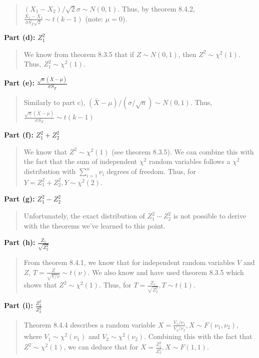 \documentclass[
]{article}
\begin{document}
\begin{quote}
\((X_1 - X_2)/\sqrt{2}\sigma \sim N(0,1)\). Thus, by theorem 8.4.2,
\(\frac{X_1 - X_2}{\sigma S_Z \sqrt{2}} \sim t(k - 1)\) (note:
\(\mu = 0\)).
\end{quote}

\textbf{Part (d):} \(Z_1^2\)

\begin{quote}
We know from theorem 8.3.5 that if \(Z\sim N(0,1)\), then
\(Z^2 \sim \chi^2(1)\). Thus, \(Z_1^2 \sim \chi^2(1)\).
\end{quote}

\textbf{Part (e):} \(\frac{\sqrt{n} (\bar{X} - \mu)}{\sigma S_Z}\)

\begin{quote}
Similarly to part c), \((\bar{X} - \mu)/(\sigma/\sqrt{n}) \sim N(0,1)\).
Thus, \(\frac{\sqrt{n} (\bar{X} - \mu)}{\sigma S_Z} \sim t(k - 1)\)
\end{quote}

\textbf{Part (f):} \(Z_1^2 + Z_2^2\)

\begin{quote}
We know that \(Z^2 \sim \chi^2(1)\) (see theorem 8.3.5). We can combine
this with the fact that the sum of independent \(\chi^2\) random
variables follows a \(\chi^2\) distribution with
\(\sum_{i = 1}^{n} \nu_i\) degrees of freedom. Thus, for
\(Y = Z_1^2 + Z_2^2, Y \sim \chi^2(2)\).
\end{quote}

\textbf{Part (g):} \(Z_1^2 - Z_2^2\)

\begin{quote}
Unfortunately, the exact distribution of \(Z_1^2 - Z_2^2\) is not
possible to derive with the theorems we've learned to this point.
\end{quote}

\textbf{Part (h):} \(\frac{Z_1}{\sqrt{Z_2^2}}\)

\begin{quote}
From theorem 8.4.1, we know that for independent random variables \(V\)
and \(Z\), \(T = \frac{Z}{\sqrt{V/\nu}} \sim t(\nu)\). We also know and
have used theorem 8.3.5 which shows that \(Z^2 \sim \chi^2(1)\). Thus,
for \(T = \frac{Z_1}{\sqrt{Z_2^2}}, T \sim t(1)\).
\end{quote}

\textbf{Part (i):} \(\frac{Z_1^2}{Z_2^2}\)

\begin{quote}
Theorem 8.4.4 describes a random variable
\(X = \frac{V_1/\nu_1}{V_2/\nu_2}, X \sim F(\nu_1, \nu_2)\), where
\(V_1 \sim \chi^2(\nu_1)\) and \(V_2 \sim \chi^2(\nu_2)\). Combining
this with the fact that \(Z^2 \sim \chi^2(1)\), we can deduce that for
\(X = \frac{Z_1^2}{Z_2^2}, X \sim F(1, 1)\).
\end{quote}
\end{document}
